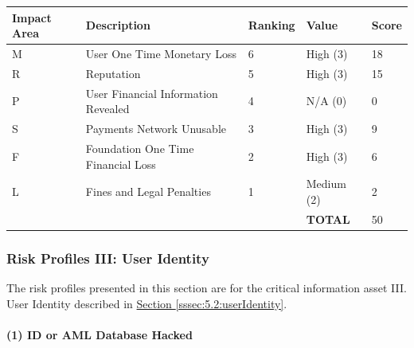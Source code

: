 \documentclass[a4paper,12pt]{article} %
\newcommand{\hypersectionref}[1]{\hyperref[#1]{Section \ref{#1}}}
\begin{document}
{\begin{center}
\begin{tabular}{ | l | l | l | l | l |}
  \hline
  \textbf{Impact Area} & \textbf{Description} & \textbf{Ranking} & \textbf{Value} & \textbf{Score}
  \\ \hline
  M & User One Time Monetary Loss			& 6	& High (3)		& 18
  \\ \hline
  R & Reputation		& 5	& High (3)		& 15
  \\ \hline
  P & User Financial Information Revealed		& 4	& N/A (0)		& 0
  \\ \hline
  S & Payments Network Unusable					& 3	& High (3)		& 9
  \\ \hline
  F & Foundation One Time Financial Loss	& 2	& High (3)		& 6
  \\ \hline
  L & Fines and Legal Penalties						& 1	& Medium (2)	& 2
  \\ \hline
  & & & \textbf{TOTAL} & 50
  \\ \hline
\end{tabular}
\end{center}
\label{tab:severityBribeKeyCustodian}


\subsubsection{Risk Profiles III: User Identity} \label{sssec:5.3:userIdentityRiskProfiles}

The risk profiles presented in this section are for the critical information asset III. User Identity described in \hypersectionref{sssec:5.2:userIdentity}.

\paragraph{(1) ID or AML Database Hacked }

}
\end{document}
